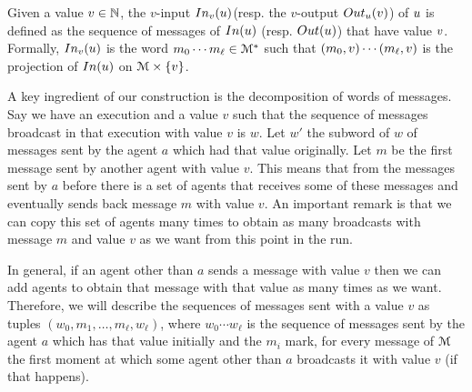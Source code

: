 \begin{definition}
	Given a value $v \in \mathbb{N} $, the $v$-input $\vinput{\aval}{\localrun} $(resp. the $v$-output $\voutput{\localrun}{\aval}$) of $u$ is defined as the sequence of messages of $\Input{\localrun}$ (resp. $\Output{\localrun}$) that have value $v$. Formally, $\vinput{\aval}{\localrun}$ is the word $m_0 \cdots m_{\ell} \in \mathcal{M}^*$ such that $(m_0, v) \cdots (m_{\ell}, v)$ is the projection of $\Input{\localrun}$ on $\mathcal{M} \times \{v\}$.  
	
	
	

\end{definition}

A key ingredient of our construction is the decomposition of words of messages. Say we have an execution and a value $v$ such that the sequence of messages broadcast in that execution with value $v$ is $w$. Let $w'$ the subword of $w$ of messages sent by the agent $a$ which had that value originally. Let $m$ be the first message sent by another agent with value $v$. This means that from the messages sent by $a$ before there is a set of agents that receives some of these messages and eventually sends back message $m$ with value $v$. An important remark is that we can copy this set of agents many times to obtain as many broadcasts with message $m$ and value $v$ as we want from this point in the run.

In general, if an agent other than $a$ sends a message with value $v$ then we can add agents to obtain that message with that value as many times as we want.
Therefore, we will describe the sequences of messages sent with a value $v$ as tuples $(w_0, m_1, \ldots, m_\ell, w_\ell)$, where $w_0 \cdots w_\ell$ is the sequence of messages sent by the agent $a$ which has that value initially and the $m_i$ mark, for every message of $\mathcal{M}$ the first moment at which some agent other than $a$ broadcasts it with value $v$ (if that happens).

